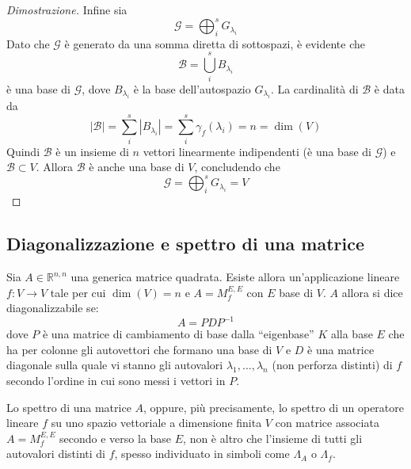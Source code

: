 \documentclass{article}
\begin{document}
\begin{proof}[Dimostrazione]
        \vspace{5pt}
        Infine sia
        \[
            \mathcal{G} = \bigoplus_{i}^{s} G_{\lambda_i}
        \]
        Dato che $\mathcal{G}$ è generato da una somma diretta di sottospazi, è evidente che 
        \[
            \mathcal{B} = \bigcup_{i}^{s} B_{\lambda_i}
        \]
        è una base di $\mathcal{G}$, dove $B_{\lambda_i}$ è la base dell'autospazio $G_{\lambda_i}$. La cardinalità di $\mathcal{B}$ è data da 
        \[
            |\mathcal{B}| = \sum_{i}^{s} |B_{\lambda_i}| = \sum_{i}^{s} \gamma_{f}(\lambda_i) = n = \dim(V)
        \]
        Quindi $\mathcal{B}$ è un insieme di $n$ vettori linearmente indipendenti (è una base di $\mathcal{G}$) e $\mathcal{B} \subset V$. Allora $\mathcal{B}$ è anche una base di $V$, concludendo che
        \[
            \mathcal{G} = \bigoplus_{i}^{s} G_{\lambda_i} = V
        \]
        
    \end{proof}




\vspace{10pt}    
\subsection{Diagonalizzazione e spettro di una matrice} \label{subsec:linappdiag}
    Sia $A \in \mathbb{R}^{n, n}$ una generica matrice quadrata. Esiste allora un'applicazione lineare $f: V \rightarrow V$ tale per cui $\dim(V) = n$ e $A = M_{f}^{E, E}$ con $E$ base di $V$. $A$ allora si dice diagonalizzabile se:
    \[
        A = PDP^{-1}
    \]
    dove $P$ è una matrice di cambiamento di base dalla ``eigenbase'' $K$ alla base $E$ che ha per colonne gli autovettori che formano una base di $V$ e $D$ è una matrice diagonale sulla quale vi stanno gli autovalori $\lambda_1, ..., \lambda_n$ (non perforza distinti) di $f$
    secondo l'ordine in cui sono messi i vettori in $P$.
    
    \vspace{10pt}
    Lo spettro di una matrice $A$, oppure, più precisamente, lo spettro di un operatore lineare $f$ su uno spazio vettoriale a dimensione finita $V$ con matrice associata $A = M_{f}^{E, E}$ secondo e verso la base $E$, non è altro che l'insieme di tutti gli autovalori distinti di $f$, spesso 
    individuato in simboli come $\Lambda_{A}$ o $\Lambda_{f}$.
\end{document}
